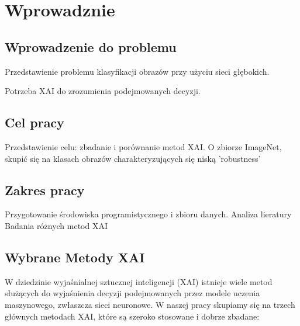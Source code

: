 
\chapter*{Wprowadznie}

\section*{Wprowadzenie do problemu}
Przedstawienie problemu klasyfikacji obrazów przy użyciu sieci głębokich.

Potrzeba XAI do zrozumienia podejmowanych decyzji.

\section*{Cel pracy}
Przedstawienie celu: zbadanie i porównanie metod XAI.
O zbiorze ImageNet, skupić się na klasach obrazów charakteryzujących się niską 'robustness'

\section*{Zakres pracy}
Przygotowanie środowiska programistycznego i zbioru danych.
Analiza lieratury
Badania różnych metod XAI

\section*{Wybrane Metody XAI}

W dziedzinie wyjaśnialnej sztucznej inteligencji (XAI) istnieje wiele metod służących do wyjaśnienia decyzji podejmowanych przez modele uczenia maszynowego, zwłaszcza sieci neuronowe.
W naszej pracy skupiamy się na trzech głównych metodach XAI, które są szeroko stosowane i dobrze zbadane:

